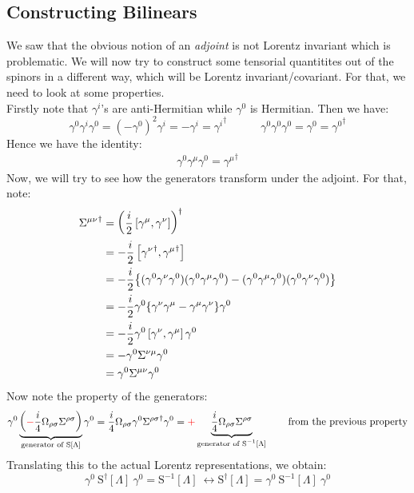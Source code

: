 \subsection{Constructing Bilinears}
We saw that the obvious notion of an \textit{adjoint} is not Lorentz invariant which is problematic. We will now try to construct some tensorial quantitites out of the spinors in a different way, which will be Lorentz invariant/covariant. For that, we need to look at some properties. \\[0.2cm]
Firstly note that $\gamma^i$'s are anti-Hermitian while $\gamma^0$ is Hermitian. Then we have:
$$\gamma^0 \gamma^i \gamma^0 = (-\gamma^0)^2\gamma^i = -\gamma^i = {\gamma^i}^\dagger\qquad\quad \gamma^0 \gamma^0 \gamma^0= \gamma^0={\gamma^0}^\dagger$$
Hence we have the identity:
\begin{align}\label{eqn:gamiden}
  \boxed{\gamma^0 \gamma^\mu \gamma^0 = {\gamma^\mu}^\dagger}
\end{align}
Now, we will try to see how the generators transform under the adjoint. For that, note:
\begin{align*}
  {\Sigma^{\mu\nu}}^\dagger &= \qty(\frac{i}{2} \left[ \gamma^\mu, \gamma^\nu \right])^\dagger\\
  &=-\frac{i}{2}\left[ {\gamma^\nu}^\dagger, {\gamma^\mu}^\dagger \right]\\
  &=-\frac{i}{2}\qty{(\gamma^0 \gamma^\nu \gamma^0)(\gamma^0 \gamma^\mu \gamma^0)-(\gamma^0 \gamma^\mu \gamma^0)(\gamma^0 \gamma^\nu \gamma^0) }\\
  &=-\frac{i}{2}\gamma^0\qty{\gamma^\nu \gamma^\mu - \gamma^\mu \gamma^\nu  }\gamma^0\\
  &= -\frac{i}{2}\gamma^0 \left[ \gamma^\nu, \gamma^\mu \right]\gamma^0\\
  &=-\gamma^0 \Sigma^{\nu\mu}\gamma^0 \\
  &=\gamma^0 \Sigma^{\mu\nu}\gamma^0
\end{align*}
Now note the property of the generators:
\begin{align*}
  \gamma^0 \underbrace{\qty(\mathcolor{red}{-}\frac{i}{4}\Omega_{\rho\sigma}\Sigma^{\rho\sigma})}_{\text{generator of $\lrep$}}\gamma^0 = \frac{i}{4}\Omega_{\rho\sigma}\gamma^0 {\Sigma^{\rho\sigma}}^\dagger \gamma^0 =\mathcolor{red}{+} \underbrace{\frac{i}{4}\Omega_{\rho\sigma}\Sigma^{\rho\sigma}}_{\text{generator of $\mathrm{S}^{-1}[\Lambda]$}} \qquad \text{from the previous property}
\end{align*}
Translating this to the actual Lorentz representations, we obtain:
$$\gamma^0\ \mathrm{S}^\dagger[\Lambda] \ \gamma^0 = \mathrm{S}^{-1}[\Lambda]\ \longleftrightarrow  \mathrm{S}^\dagger[\Lambda]  =\gamma^0\ \mathrm{S}^{-1}[\Lambda]\ \gamma^0$$
